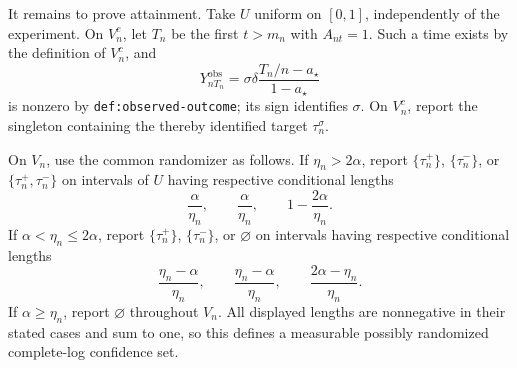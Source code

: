 It remains to prove attainment. Take \(U\) uniform on \([0,1]\), independently of the experiment. On \(V_n^c\), let \(T_n\) be the first \(t>m_n\) with \(A_{nt}=1\). Such a time exists by the definition of \(V_n^c\), and
\[
 Y_{nT_n}^{\mathrm{obs}}
 =\sigma\delta\frac{T_n/n-a_\star}{1-a_\star}
\]
is nonzero by \texttt{def:observed-outcome}; its sign identifies \(\sigma\). On \(V_n^c\), report the singleton containing the thereby identified target \(\tau_n^\sigma\).

On \(V_n\), use the common randomizer as follows. If \(\eta_n>2\alpha\), report \(\{\tau_n^+\}\), \(\{\tau_n^-\}\), or \(\{\tau_n^+,\tau_n^-\}\) on intervals of \(U\) having respective conditional lengths
\[
 \frac\alpha{\eta_n},\qquad
 \frac\alpha{\eta_n},\qquad
 1-\frac{2\alpha}{\eta_n}.
\]
If \(\alpha<\eta_n\le2\alpha\), report \(\{\tau_n^+\}\), \(\{\tau_n^-\}\), or \(\varnothing\) on intervals having respective conditional lengths
\[
 \frac{\eta_n-\alpha}{\eta_n},\qquad
 \frac{\eta_n-\alpha}{\eta_n},\qquad
 \frac{2\alpha-\eta_n}{\eta_n}.
\]
If \(\alpha\ge\eta_n\), report \(\varnothing\) throughout \(V_n\). All displayed lengths are nonnegative in their stated cases and sum to one, so this defines a measurable possibly randomized complete-log confidence set.


